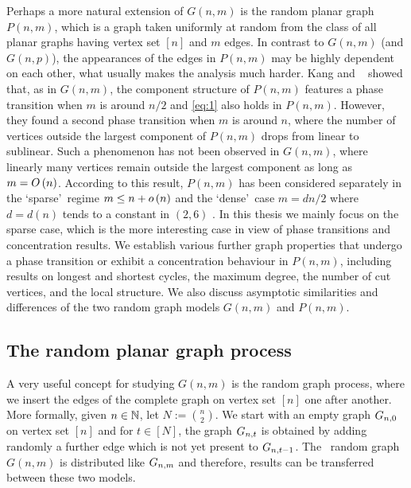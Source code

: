 Perhaps a more natural extension of $G(n,m)$ is the random planar graph $P(n,m)$, which is a graph taken uniformly at random from the class of all planar graphs having vertex set $[n]$ and $m$ edges. In contrast to $G(n,m)$ (and $G(n,p)$), the appearances of the edges in $P(n,m)$ may be highly dependent on each other, what usually makes the analysis much harder. Kang and \Luczak\ \cite{KangLuczak2012} showed that, as in $G(n,m)$, the component structure of $P(n,m)$ features a phase transition when $m$ is around $n/2$ and \eqref{eq:1} also holds in $P(n,m)$. However, they found a second phase transition when $m$ is around $n$, where the number of vertices outside the largest component of $P(n,m)$ drops from linear to sublinear. Such a phenomenon has not been observed in $G(n,m)$, where linearly many vertices remain outside the largest component as long as $m=O\left(n\right)$. According to this result, $P(n,m)$ has been considered separately in the \lq sparse\rq\ regime $m\leq n+o\left(n\right)$ \cite{KangLuczak2012,KangMosshammerSpruessel2020} and the \lq dense\rq\ case $m=dn/2$ where $d=d(n)$ tends to a constant in $(2,6)$ \cite{ChapuyFusyGimenezMoharNoy2011,GimenezNoy2009}. In this thesis we mainly focus on the sparse case, which is the more interesting case in view of phase transitions and concentration results. We establish various further graph properties that undergo a phase transition or exhibit a concentration behaviour in $P(n,m)$, including results on longest and shortest cycles, the maximum degree, the number of cut vertices, and the local structure. We also discuss asymptotic similarities and differences of the two random graph models $G(n,m)$ and $P(n,m)$.

\subsection{The random planar graph process}
A very useful concept for studying $G(n,m)$ is the random graph process, where we insert the edges of the complete graph on vertex set $[n]$ one after another. More formally, given $n\in\mathbb{N}$, let $N:=\binom{n}{2}$. We start with an empty graph $G_{n,0}$ on vertex set $[n]$ and for $t\in[N]$, the graph $G_{n,t}$ is obtained by adding randomly a further edge which is not yet present to $G_{n,t-1}$. The \ER\ random graph $G(n,m)$ is distributed like $G_{n,m}$ and therefore, results can be transferred between these two models.

